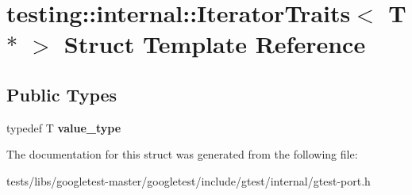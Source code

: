 \hypertarget{structtesting_1_1internal_1_1IteratorTraits_3_01T_01_5_01_4}{}\section{testing\+:\+:internal\+:\+:Iterator\+Traits$<$ T $\ast$ $>$ Struct Template Reference}
\label{structtesting_1_1internal_1_1IteratorTraits_3_01T_01_5_01_4}
\subsection*{Public Types}
\begin{DoxyCompactItemize}
\item 
\mbox{\label{structtesting_1_1internal_1_1IteratorTraits_3_01T_01_5_01_4_a7e46869ed36cc5aea898e243d270a8be}} 
typedef T {\bfseries value\+\_\+type}
\end{DoxyCompactItemize}


The documentation for this struct was generated from the following file\+:\begin{DoxyCompactItemize}
\item 
tests/libs/googletest-\/master/googletest/include/gtest/internal/gtest-\/port.\+h\end{DoxyCompactItemize}
